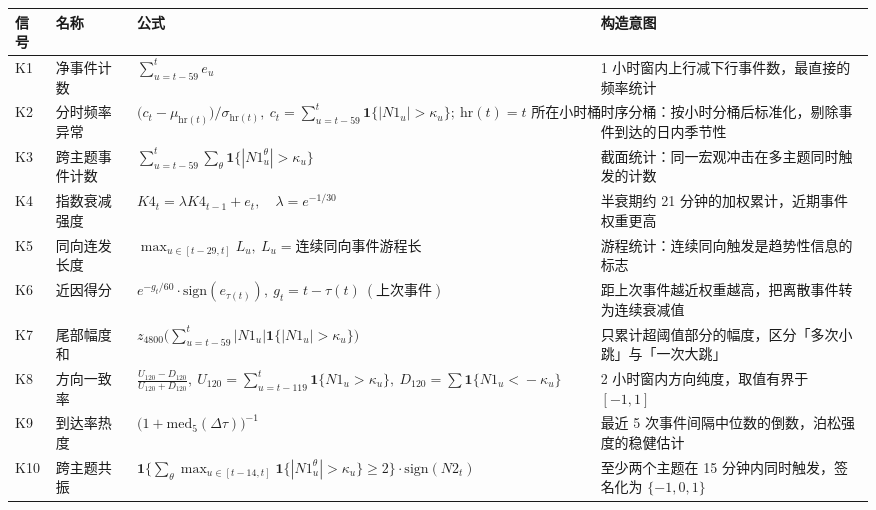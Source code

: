 \setlength{\tabcolsep}{4pt}
\begin{tabular}{llp{6.4cm}p{4.5cm}}
\toprule
信号 & 名称 & 公式 & 构造意图 \\
\midrule
K1 & 净事件计数 & $\displaystyle \sum_{u=t-59}^{t} e_u$ & 1 小时窗内上行减下行事件数，最直接的频率统计 \\
K2 & 分时频率异常 & $\displaystyle \big(c_t-\mu_{\mathrm{hr}(t)}\big)\big/\sigma_{\mathrm{hr}(t)},\ c_t=\textstyle\sum_{u=t-59}^{t}\mathbf{1}\{|N1_u|>\kappa_u\};\ \mathrm{hr}(t)=t\text{ 所在小时桶}$ & 时序分桶：按小时分桶后标准化，剔除事件到达的日内季节性 \\
K3 & 跨主题事件计数 & $\displaystyle \sum_{u=t-59}^{t}\sum_{\theta}\mathbf{1}\{|N1^{\theta}_u|>\kappa_u\}$ & 截面统计：同一宏观冲击在多主题同时触发的计数 \\
K4 & 指数衰减强度 & $\displaystyle K4_t=\lambda K4_{t-1}+e_t,\quad \lambda=e^{-1/30}$ & 半衰期约 21 分钟的加权累计，近期事件权重更高 \\
K5 & 同向连发长度 & $\displaystyle \max_{u\in[t-29,t]} L_u,\ L_u=\text{连续同向事件游程长}$ & 游程统计：连续同向触发是趋势性信息的标志 \\
K6 & 近因得分 & $\displaystyle e^{-g_t/60}\cdot\mathrm{sign}(e_{\tau(t)}),\ g_t=t-\tau(t)\ (\text{上次事件})$ & 距上次事件越近权重越高，把离散事件转为连续衰减值 \\
K7 & 尾部幅度和 & $\displaystyle z_{4800}\!\Big(\sum_{u=t-59}^{t}|N1_u|\mathbf{1}\{|N1_u|>\kappa_u\}\Big)$ & 只累计超阈值部分的幅度，区分「多次小跳」与「一次大跳」 \\
K8 & 方向一致率 & $\displaystyle \frac{U_{120}-D_{120}}{U_{120}+D_{120}},\ U_{120}\!=\!\textstyle\sum_{u=t-119}^{t}\mathbf{1}\{N1_u\!>\!\kappa_u\},\ D_{120}\!=\!\textstyle\sum\mathbf{1}\{N1_u\!<\!-\kappa_u\}$ & 2 小时窗内方向纯度，取值有界于 $[-1,1]$ \\
K9 & 到达率热度 & $\displaystyle \big(1+\mathrm{med}_{5}(\Delta\tau)\big)^{-1}$ & 最近 5 次事件间隔中位数的倒数，泊松强度的稳健估计 \\
K10 & 跨主题共振 & $\displaystyle \mathbf{1}\Big\{\textstyle\sum_{\theta}\max_{u\in[t-14,t]}\mathbf{1}\{|N1^{\theta}_u|>\kappa_u\}\ge 2\Big\}\cdot\mathrm{sign}(N2_t)$ & 至少两个主题在 15 分钟内同时触发，签名化为 $\{-1,0,1\}$ \\
\bottomrule
\end{tabular}
